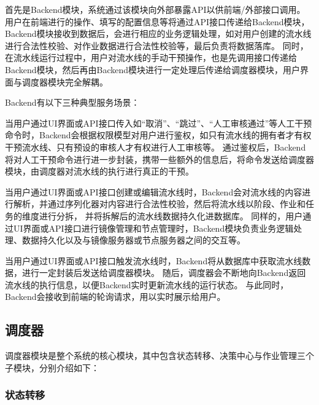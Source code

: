 首先是Backend模块，系统通过该模块向外部暴露API以供前端/外部接口调用。
用户在前端进行的操作、填写的配置信息等将通过API接口传递给Backend模块，Backend模块接收到数据后，会进行相应的业务逻辑处理，如对用户创建的流水线进行合法性校验、对作业数据进行合法性校验等，最后负责将数据落库。
同时，在流水线运行过程中，用户对流水线的手动干预操作，也是先调用接口传递给Backend模块，然后再由Backend模块进行一定处理后传递给调度器模块，用户界面与调度器模块完全解耦。

Backend有以下三种典型服务场景：

当用户通过UI界面或API接口传入如“取消”、“跳过”、“人工审核通过”等人工干预命令时，Backend会根据权限模型对用户进行鉴权，如只有流水线的拥有者才有权干预流水线、只有预设的审核人才有权进行人工审核等。
通过鉴权后，Backend将对人工干预命令进行进一步封装，携带一些额外的信息后，将命令发送给调度器模块，由调度器对流水线的执行进行真正的干预。

当用户通过UI界面或API接口创建或编辑流水线时，Backend会对流水线的内容进行解析，并通过序列化器对内容进行合法性校验，然后将流水线以阶段、作业和任务的维度进行分拆，
并将拆解后的流水线数据持久化进数据库。
同样的，用户通过UI界面或API接口进行镜像管理和节点管理时，Backend模块负责业务逻辑处理、数据持久化以及与镜像服务器或节点服务器之间的交互等。

当用户通过UI界面或API接口触发流水线时，Backend将从数据库中获取流水线数据，进行一定封装后发送给调度器模块。
随后，调度器会不断地向Backend返回流水线的执行信息，以便Backend实时更新流水线的运行状态。
与此同时，Backend会接收到前端的轮询请求，用以实时展示给用户。

\subsection{调度器}

调度器模块是整个系统的核心模块，其中包含状态转移、决策中心与作业管理三个子模块，分别介绍如下：

\subsubsection{状态转移}


